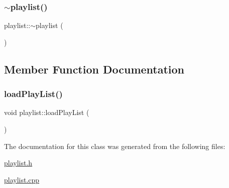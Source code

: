 \mbox{\label{classplaylist_af36b9d7df2267ddfac92496ced1c235c}} 
\subsubsection{\texorpdfstring{$\sim$playlist()}{~playlist()}}
{\footnotesize\ttfamily playlist\+::$\sim$playlist (\begin{DoxyParamCaption}{ }\end{DoxyParamCaption})}



\subsection{Member Function Documentation}
\mbox{\label{classplaylist_a8dd729dc3ef1195d6667c00624f3057d}} 
\subsubsection{\texorpdfstring{loadPlayList()}{loadPlayList()}}
{\footnotesize\ttfamily void playlist\+::load\+Play\+List (\begin{DoxyParamCaption}{ }\end{DoxyParamCaption})}



The documentation for this class was generated from the following files\+:\begin{DoxyCompactItemize}
\item 
\mbox{\hyperlink{playlist_8h}{playlist.\+h}}\item 
\mbox{\hyperlink{playlist_8cpp}{playlist.\+cpp}}\end{DoxyCompactItemize}
